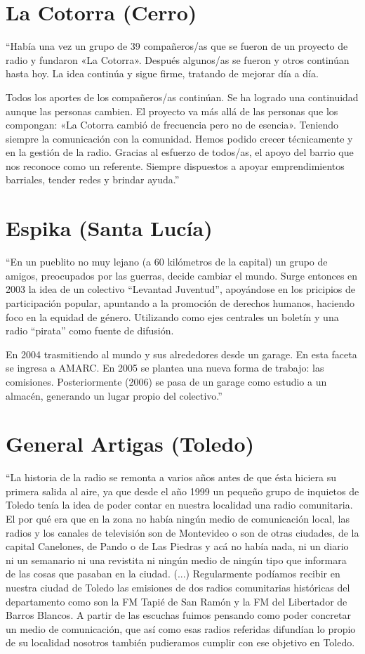 \section*{La Cotorra (Cerro)}
``Había una vez un grupo de 39 compañeros/as que se fueron de un proyecto de radio y fundaron «La Cotorra». Después algunos/as se fueron y otros continúan hasta hoy. La idea continúa y sigue firme, tratando de mejorar día a día.

Todos los aportes de los compañeros/as continúan. Se ha logrado una continuidad aunque las personas cambien. El proyecto va más allá de las personas que los compongan: «La Cotorra cambió de frecuencia pero no de esencia». Teniendo siempre la comunicación con la comunidad. Hemos podido crecer técnicamente y en la gestión de la radio. Gracias al esfuerzo de todos/as, el apoyo del barrio que nos reconoce como un referente. Siempre dispuestos a apoyar emprendimientos barriales, tender redes y brindar ayuda.''

\section*{Espika (Santa Lucía)}

``En un pueblito no muy lejano (a 60 kilómetros de la capital) un grupo de amigos, preocupados por las guerras, decide cambiar el mundo. Surge entonces en 2003 la idea de un colectivo “Levantad Juventud”, apoyándose en los pricipios de participación popular, apuntando a la promoción de derechos humanos, haciendo foco en la equidad de género. Utilizando como ejes centrales un boletín y una radio “pirata” como fuente de difusión. 

En 2004 trasmitiendo al mundo y sus alrededores desde un garage. En esta faceta se ingresa a AMARC. En 2005 se plantea una nueva forma de trabajo: las comisiones. Posteriormente (2006) se pasa de un garage como estudio a un almacén, generando un lugar propio del colectivo.''

\section*{General Artigas (Toledo)}
``La historia de la radio se remonta a varios años antes de que ésta hiciera su primera salida al aire, ya que desde el año 1999 un pequeño grupo de inquietos de Toledo tenía la idea de poder contar en nuestra localidad una radio comunitaria. El por qué era que en la zona no había ningún medio de comunicación local, las radios y los canales de televisión son de Montevideo o son de otras ciudades, de la capital Canelones, de Pando o de Las Piedras y acá no había nada, ni un diario ni un semanario ni una revistita ni ningún medio de ningún tipo que informara de las cosas que pasaban en la ciudad. (...) Regularmente podíamos recibir en nuestra ciudad de Toledo las emisiones de dos radios comunitarias históricas del departamento como son la FM Tapié de San Ramón y la FM del Libertador de Barros Blancos. A partir de las escuchas fuimos pensando como poder concretar un medio de comunicación, que así como esas radios referidas difundían lo propio de su localidad nosotros también pudieramos cumplir con ese objetivo en Toledo.

